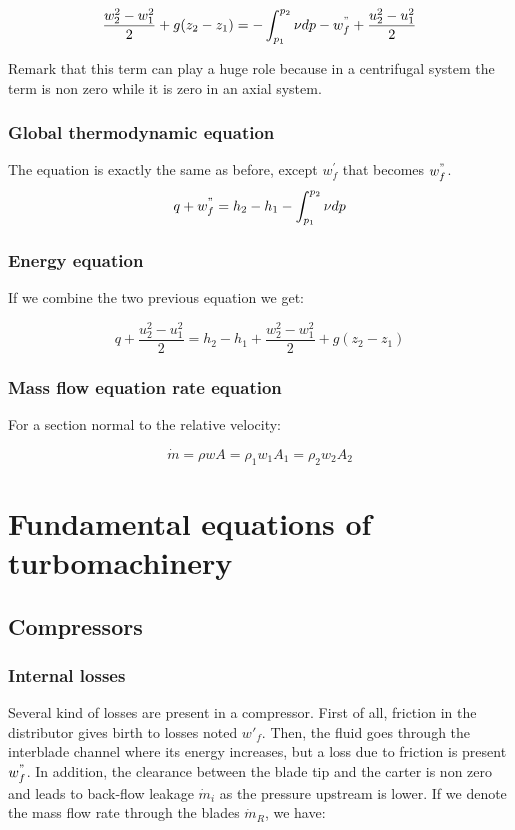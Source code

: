 \begin{equation}
 \frac{w_2^2 - w_1^2}{2} + g(z_2-z_1) = - \int _{p_1}^{p_2} \nu dp - w^"_f + \frac{u_2^2-u_1^2}{2}
 \label{2.5}
\end{equation}

Remark that this term can play a huge role because in a centrifugal system the term is non zero while it is zero in an axial system. 

\subsubsection{Global thermodynamic equation}
The equation is exactly the same as before, except $w^'_f$ that becomes $w^"_f$. 
\begin{equation}
q + w^"_f = h_2 - h_1 - \int _{p_1}^{p_2} \nu dp
\end{equation}

\subsubsection{Energy equation}
If we combine the two previous equation we get: 

\begin{equation}
q + \frac{u_2^2-u_1^2}{2} = h_2 - h_1 + \frac{w_2^2 - w_1^2}{2} + g(z_2-z_1)
\end{equation}

\subsubsection{Mass flow equation rate equation}
For a section normal to the relative velocity:

\begin{equation}
\dot{m} = \rho w A = \rho _1 w_1 A_1 = \rho _2 w_2 A_2
\end{equation}


\section{Fundamental equations of turbomachinery}
\subsection{Compressors}
\subsubsection{Internal losses}
Several kind of losses are present in a compressor. First of all, friction in the distributor gives birth to losses noted $w'_f$. Then, the fluid goes through the interblade channel where its energy increases, but a loss due to friction is present $w^"_f$. In addition, the clearance between the blade tip and the carter is non zero and leads to back-flow leakage $\dot{m}_i$ as the pressure upstream is lower. If we denote the mass flow rate through the blades $\dot{m}_R$, we have: 

